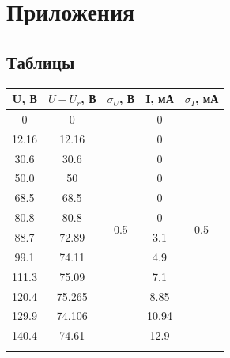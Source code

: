 \documentclass[14pt, a4paper,reqno]{article}
\begin{document}
\newpage
\section{Приложения}

    \subsection{Таблицы}

    \begin{minipage}{0.49\linewidth}
    \begin{center}
        \begin{tabular}{|c|c|c|c|c|}
            \hline
            U, В    & $U - U_r$, В & $\sigma_U$, В         & I, мА & $\sigma_I$, мА        \\ \hline
            \hline
            0       & 0          & \multirow{16}{*}{0.5} & 0     & \multirow{16}{*}{0.5} \\ \hhline{--~-~}
            12.16   & 12.16      &                       & 0     &                       \\ \hhline{--~-~}
            30.6    & 30.6       &                       & 0     &                       \\ \hhline{--~-~}
            50.0    & 50         &                       & 0     &                       \\ \hhline{--~-~}
            68.5    & 68.5       &                       & 0     &                       \\ \hhline{--~-~}
            80.8    & 80.8       &                       & 0     &                       \\ \hhline{--~-~}
            88.7    & 72.89      &                       & 3.1   &                       \\ \hhline{--~-~}
            99.1    & 74.11      &                       & 4.9   &                       \\ \hhline{--~-~}
            111.3   & 75.09      &                       & 7.1   &                       \\ \hhline{--~-~}
            120.4   & 75.265     &                       & 8.85  &                       \\ \hhline{--~-~}
            129.9   & 74.106     &                       & 10.94 &                       \\ \hhline{--~-~}
            140.4   & 74.61      &                       & 12.9  &                       \\ \hhline{--~-~}

\end{tabular}
\end{center}
\end{minipage}
\end{document}
